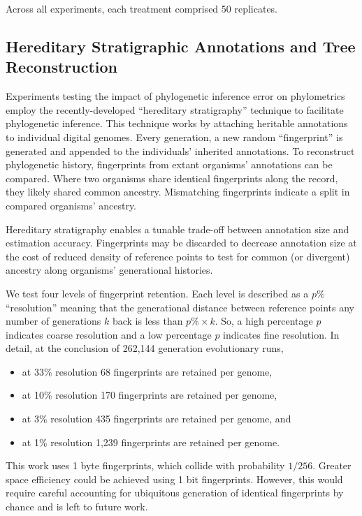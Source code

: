 Across all experiments, each treatment comprised 50 replicates.

\subsection{Hereditary Stratigraphic Annotations and Tree Reconstruction}

Experiments testing the impact of phylogenetic inference error on phylometrics employ the recently-developed ``hereditary stratigraphy'' technique to facilitate phylogenetic inference.
This technique works by attaching heritable annotations to individual digital genomes.
Every generation, a new random ``fingerprint'' is generated and appended to the individuals' inherited annotations.
To reconstruct phylogenetic history, fingerprints from extant organisms' annotations can be compared.
Where two organisms share identical fingerprints along the record, they likely shared common ancestry.
Mismatching fingerprints indicate a split in compared organisms' ancestry.

Hereditary stratigraphy enables a tunable trade-off between annotation size and estimation accuracy.
Fingerprints may be discarded to decrease annotation size at the cost of reduced density of reference points to test for common (or divergent) ancestry along organisms' generational histories.

We test four levels of fingerprint retention.
Each level is described as a $p\%$ ``resolution'' meaning that the generational distance between reference points any number of generations $k$ back is less than $p\% \times k$.
So, a high percentage $p$ indicates coarse resolution and a low percentage $p$ indicates fine resolution.
In detail, at the conclusion of 262,144 generation evolutionary runs,
\begin{itemize}
  \item at 33\% resolution 68 fingerprints are retained per genome,
  \item at 10\% resolution 170 fingerprints are retained per genome,
  \item at 3\% resolution 435 fingerprints are retained per genome, and
  \item at 1\% resolution 1,239 fingerprints are retained per genome.
\end{itemize}

This work uses 1 byte fingerprints, which collide with probability $1/256$.
Greater space efficiency could be achieved using 1 bit fingerprints.
However, this would require careful accounting for ubiquitous generation of identical fingerprints by chance and is left to future work.

